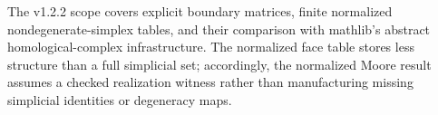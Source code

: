 The v1.2.2 scope covers explicit boundary matrices, finite normalized
nondegenerate-simplex tables, and their comparison with mathlib's abstract
homological-complex infrastructure.  The normalized face table stores less
structure than a full simplicial set; accordingly, the normalized Moore
result assumes a checked realization witness rather than manufacturing
missing simplicial identities or degeneracy maps.
